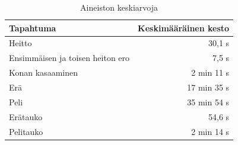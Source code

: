     \begin{table}[!ht]
        \centering
        \begin{tabular}{@{}lr@{}}
            \toprule
            Tapahtuma & Keskimääräinen kesto \\
            \midrule
            Heitto & 30,1 s \\
            Ensimmäisen ja toisen heiton ero & 7,5 s \\
            Konan kasaaminen & 2 min 11 s \\
            Erä & 17 min 35 s \\
            Peli & 35 min 54 s \\
            Erätauko & 54,6 s \\
            Pelitauko & 2 min 14 s \\
            \bottomrule
        \end{tabular}
        \caption{Aineiston keskiarvoja\label{tab:averages}}
    \end{table}